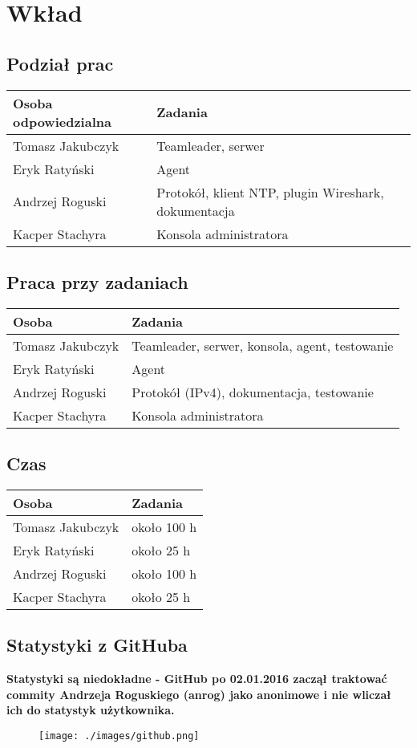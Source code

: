 \documentclass[10pt,a4paper]{article}
\begin{document}
	\section{Wkład}
	\subsection{Podział prac}
	    \begin{tabular}{ l | l }
		    \textbf{Osoba odpowiedzialna} & \textbf{Zadania} \\
		    \hline
		    Tomasz Jakubczyk  & Teamleader, serwer  \\
		    Eryk Ratyński  & Agent  \\
		    Andrzej Roguski  & Protokół, klient NTP, plugin Wireshark, dokumentacja \\
		    Kacper Stachyra & Konsola administratora \\
		\end{tabular}
		
	\subsection{Praca przy zadaniach}
        \begin{tabular}{ l | l }
		    \textbf{Osoba} & \textbf{Zadania} \\
		    \hline
		    Tomasz Jakubczyk  & Teamleader, serwer, konsola, agent, testowanie  \\
		    Eryk Ratyński  & Agent  \\
		    Andrzej Roguski  & Protokół (IPv4), dokumentacja, testowanie \\
		    Kacper Stachyra & Konsola administratora \\
		\end{tabular}
		
	\subsection{Czas}
        \begin{tabular}{ l | l }
		    \textbf{Osoba} & \textbf{Zadania} \\
		    \hline
		    Tomasz Jakubczyk  & około 100 h  \\
		    Eryk Ratyński  & około 25 h  \\
		    Andrzej Roguski  & około 100 h \\
		    Kacper Stachyra & około 25 h \\
		\end{tabular}
    
    \subsection{Statystyki z GitHuba}
    \textbf{Statystyki są niedokładne - GitHub po 02.01.2016 zaczął traktować commity Andrzeja Roguskiego (anrog) jako anonimowe i nie wliczał ich do statystyk użytkownika.}
		    \begin{figure}[H]
				\texttt{[image: ./images/github.png]}
			\end{figure}
		
\end{document}
